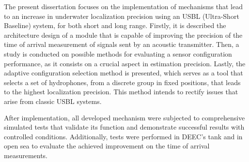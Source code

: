 The present dissertation focuses on the implementation of mechanisms that lead to an increase in underwater localization precision using an USBL (Ultra-Short Baseline) system, for both short and long range. Firstly, it is described the architecture design of a module that is capable of improving the precision of the time of arrival measurement of signals sent by an acoustic transmitter. Then, a study is conducted on possible methods for evaluating a sensor configuration performance, as it consists on a crucial aspect in estimation precision. Lastly, the adaptive configuration selection method is presented, which serves as a tool that selects a set of hydrophones, from a discrete group in fixed positions, that leads to the highest localization precision. This method intends to rectify issues that arise from classic USBL systems.

After implementation, all developed mechanism were subjected to comprehensive simulated tests that validate its function and demonstrate successful results with controlled conditions. Additionally, tests were performed in DEEC's tank and in open sea to evaluate the achieved improvement on the time of arrival measurements.